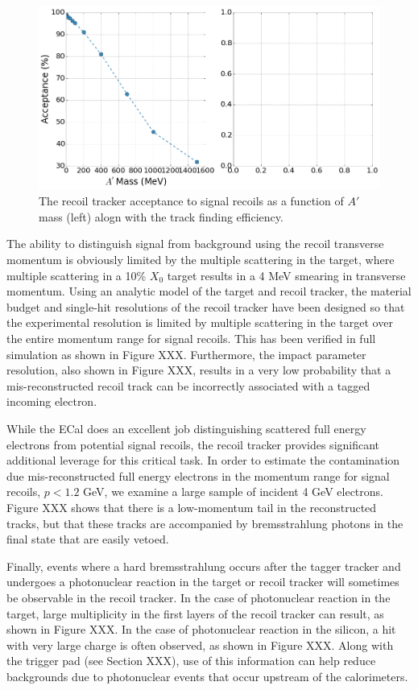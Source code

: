 \begin{figure}[htp]
    \centering
    \includegraphics[width=\textwidth]{images/tracker/signal_acceptance_eff.png}
    \caption{The recoil tracker acceptance to signal recoils as a function of 
             $A'$ mass (left) alogn with the track finding efficiency.}
    \label{fig:signal_plots}
\end{figure}

The ability to distinguish signal from background using the recoil transverse momentum is obviously limited by the multiple scattering in the target, where multiple scattering in a 10\% $X_0$ target results in a 4 MeV smearing in transverse momentum.  Using an analytic model of the target and recoil tracker, the material budget and single-hit resolutions of the recoil tracker have been designed so that the experimental resolution is limited by multiple scattering in the target over the entire momentum range for signal recoils. This has been verified in full simulation as shown in Figure XXX.  Furthermore, the impact parameter resolution, also shown in Figure XXX, results in a very low probability that a mis-reconstructed recoil track can be incorrectly associated with a tagged incoming electron.  

While the ECal does an excellent job distinguishing scattered full energy electrons from potential signal recoils, the recoil tracker provides significant additional leverage for this critical task. In order to estimate the contamination due mis-reconstructed full energy electrons in the momentum range for signal recoils, $p<1.2$ GeV, we examine a large sample of incident 4 GeV electrons.  Figure XXX shows that there is a low-momentum tail in the reconstructed tracks, but that these tracks are accompanied by bremsstrahlung photons in the final state that are easily vetoed.

Finally, events where a hard bremsstrahlung occurs after the tagger tracker and undergoes a photonuclear reaction in the target or recoil tracker will sometimes be observable in the recoil tracker.  In the case of photonuclear reaction in the target, large multiplicity in the first layers of the recoil tracker can result, as shown in Figure XXX.  In the case of photonuclear reaction in the silicon, a hit with very large charge is often observed, as shown in Figure XXX.  Along with the trigger pad (see Section XXX), use of this information can help reduce backgrounds due to photonuclear events that occur upstream of the calorimeters.



